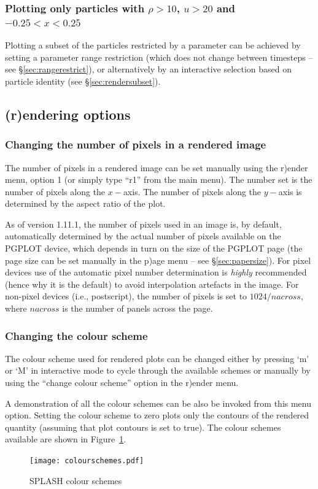 \documentclass[a4paper,10pt]{article}
\newcommand{\splash}{\textsc{SPLASH }}
\begin{document}
\subsubsection{ Plotting only particles with $\rho > 10$, $u > 20$ and $-0.25 < x < 0.25$}
 Plotting a subset of the particles restricted by a parameter can be achieved by setting a parameter range restriction (which does not change between timesteps -- see \S\ref{sec:rangerestrict}), or alternatively by an interactive selection based on particle identity (see \S\ref{sec:rendersubset}).


\subsection{(r)endering options}
\subsubsection{ Changing the number of pixels in a rendered image}
 The number of pixels in a rendered image can be set manually using the r)ender menu, option 1 (or simply type ``r1'' from the main menu). The number set is the number of pixels along the $x-$axis. The number of pixels along the $y-$axis is determined by the aspect ratio of the plot.

 As of version 1.11.1, the number of pixels used in an image is, by default, automatically determined by the actual number of pixels available on the PGPLOT device, which depends in turn on the size of the PGPLOT page (the page size can be set manually in the p)age menu -- see \S\ref{sec:papersize}). For pixel devices use of the automatic pixel number determination is \emph{highly} recommended (hence why it is the default) to avoid interpolation artefacts in the image. For non-pixel devices (i.e., postscript), the number of pixels is set to $1024/nacross$, where $nacross$ is the number of panels across the page. 

\subsubsection{ Changing the colour scheme}
 The colour scheme used for rendered plots can be changed either by pressing `m' or `M' in interactive mode to cycle through the available schemes or manually by using the ``change colour scheme'' option in the r)ender menu.

 A demonstration of all the colour schemes can be also be invoked from
this menu option. Setting the colour scheme to zero plots only the contours of
the rendered quantity (assuming that plot contours is set to true). The colour
schemes available are shown in Figure~\ref{fig:colourschemes}.
\begin{figure}
\begin{center}
\texttt{[image: colourschemes.pdf]}
\caption{\splash colour schemes}
\label{fig:colourschemes}
\end{center}
\end{figure}
\end{document}
